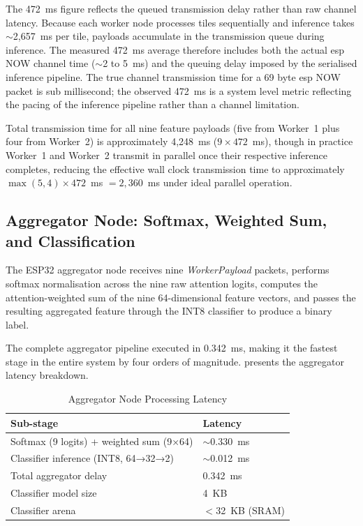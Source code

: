 The 472~ms figure reflects the queued transmission delay rather than raw channel latency.
Because each worker node processes tiles sequentially and inference takes $\sim$2,657~ms
per tile, payloads accumulate in the transmission queue during inference. The measured
472~ms average therefore includes both the actual \gls{esp} NOW channel time ($\sim$2 to 5~ms)
and the queuing delay imposed by the serialised inference pipeline. The true channel
transmission time for a 69 byte \gls{esp} NOW packet is sub millisecond; the observed
472~ms is a system level metric reflecting the pacing of the inference pipeline rather
than a channel limitation.
 
Total transmission time for all nine feature payloads (five from Worker~1 plus four from
Worker~2) is approximately 4,248~ms ($9 \times 472$~ms), though in practice Worker~1
and Worker~2 transmit in parallel once their respective inference completes, reducing
the effective wall clock transmission time to approximately
$\max(5,4) \times 472$~ms $= 2,360$~ms under ideal parallel operation.
 
\subsection{Aggregator Node: Softmax, Weighted Sum, and Classification}
 
The ESP32 aggregator node receives nine \textit{WorkerPayload} packets, performs softmax
normalisation across the nine raw attention logits, computes the attention-weighted sum
of the nine 64-dimensional feature vectors, and passes the resulting aggregated feature
through the INT8 classifier to produce a binary label.
 
The complete aggregator pipeline executed in 0.342~ms, making it the fastest stage in
the entire system by four orders of magnitude.  presents
the aggregator latency breakdown.
 
\begin{table}[H]
\renewcommand{\arraystretch}{1.25}
\caption{Aggregator Node Processing Latency}
\label{tab:aggregator_latency}
\centering
\begin{tabular}{ll}
\toprule
\textbf{Sub-stage}                                  & \textbf{Latency}  \\
\midrule
Softmax (9 logits) + weighted sum (9×64)            & $\sim$0.330~ms    \\
Classifier inference (INT8, 64→32→2)                & $\sim$0.012~ms    \\
\midrule
Total aggregator delay                              & 0.342~ms          \\
Classifier model size                               & 4~KB              \\
Classifier arena                                    & $<$32~KB (SRAM)   \\
\bottomrule
\end{tabular}
\end{table}
 

